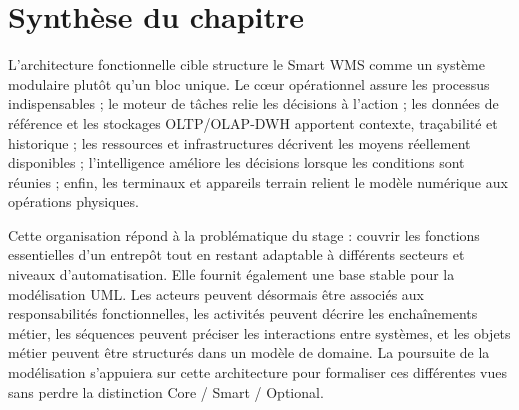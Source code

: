 





\section{Synthèse du chapitre}

\label{sec:4.11}

L’architecture fonctionnelle cible structure le Smart WMS comme un système modulaire plutôt qu’un bloc unique. Le cœur opérationnel assure les processus indispensables ; le moteur de tâches relie les décisions à l’action ; les données de référence et les stockages OLTP/OLAP-DWH apportent contexte, traçabilité et historique ; les ressources et infrastructures décrivent les moyens réellement disponibles ; l’intelligence améliore les décisions lorsque les conditions sont réunies ; enfin, les terminaux et appareils terrain relient le modèle numérique aux opérations physiques.


Cette organisation répond à la problématique du stage : couvrir les fonctions essentielles d’un entrepôt tout en restant adaptable à différents secteurs et niveaux d’automatisation. Elle fournit également une base stable pour la modélisation UML. Les acteurs peuvent désormais être associés aux responsabilités fonctionnelles, les activités peuvent décrire les enchaînements métier, les séquences peuvent préciser les interactions entre systèmes, et les objets métier peuvent être structurés dans un modèle de domaine. La poursuite de la modélisation s’appuiera sur cette architecture pour formaliser ces différentes vues sans perdre la distinction Core / Smart / Optional.

